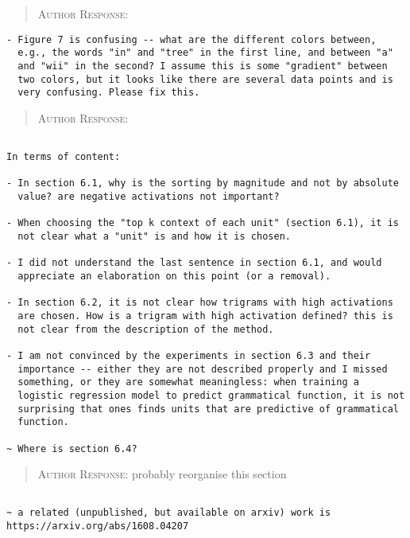 \begin{quote}
\textsc{Author Response:}  
\end{quote}
\begin{verbatim}
- Figure 7 is confusing -- what are the different colors between,
  e.g., the words "in" and "tree" in the first line, and between "a"
  and "wii" in the second? I assume this is some "gradient" between
  two colors, but it looks like there are several data points and is
  very confusing. Please fix this.
\end{verbatim}  
\begin{quote}
\textsc{Author Response:}  
\end{quote}
\begin{verbatim}

In terms of content:

- In section 6.1, why is the sorting by magnitude and not by absolute
  value? are negative activations not important?

- When choosing the "top k context of each unit" (section 6.1), it is
  not clear what a "unit" is and how it is chosen.

- I did not understand the last sentence in section 6.1, and would
  appreciate an elaboration on this point (or a removal).

- In section 6.2, it is not clear how trigrams with high activations
  are chosen. How is a trigram with high activation defined? this is
  not clear from the description of the method.

- I am not convinced by the experiments in section 6.3 and their
  importance -- either they are not described properly and I missed
  something, or they are somewhat meaningless: when training a
  logistic regression model to predict grammatical function, it is not
  surprising that ones finds units that are predictive of grammatical
  function.

~ Where is section 6.4?

\end{verbatim}  
\begin{quote}
\textsc{Author Response:} probably reorganise this section 
\end{quote}
\begin{verbatim}

~ a related (unpublished, but available on arxiv) work is
https://arxiv.org/abs/1608.04207

\end{verbatim}  
